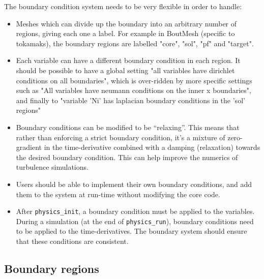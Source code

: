 \documentclass[12pt]{article}
\newcommand{\code}[1]{\texttt{#1}}
\begin{document}
The boundary condition system needs to be very flexible in order to handle:
\begin{itemize}
\item Meshes which can divide up the boundary into an arbitrary number
  of regions, giving each one a label. For example in BoutMesh 
  (specific to tokamaks), the boundary regions are labelled "core",
  "sol", "pf" and "target".
\item Each variable can have a different boundary condition in each region.
  It should be possible to have a global setting "all variables have dirichlet
  conditions on all boundaries", which is over-ridden by more specific settings
  such as "All variables have neumann conditions on the inner x boundaries", 
  and finally to "variable 'Ni' has laplacian boundary conditions in the
  'sol' regions"
\item Boundary conditions can be modified to be ``relaxing''. This means that
  rather than enforcing a strict boundary condition, it's a mixture of
  zero-gradient in the time-derivative combined with a damping (relaxation)
  towards the desired boundary condition. This can help improve the numerics
  of turbulence simulations.
\item Users should be able to implement their own boundary conditions,
  and add them to the system at run-time without modifying the core code.
\item After \code{physics\_init}, a boundary condition must be applied to
  the variables. During a simulation (at the end of \code{physics\_run}),
  boundary conditions need to be applied to the time-derivatives. The
  boundary system should ensure that these conditions are consistent.
\end{itemize}

\subsection{Boundary regions}
\label{sec:BoundaryRegion}
\end{document}
